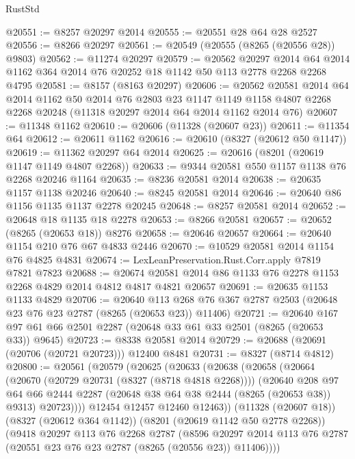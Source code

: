 \begin{lexlean}{RustStd}
\begin{coremodule}
{\begin{coremodule}
{{{{{{{{{{{{{{{{{{{{{{{{{{{{{{{{{{{{{{{{{{{{{{{{{{{{{{@20551 := @8257 @20297 @2014
@20555 := @20551 @28 @64 @28 @2527
@20556 := @8266 @20297
@20561 := @20549 (@20555 (@8265 (@20556 @28)) @9803)
@20562 := @11274 @20297
@20579 := @20562
    @20297
    @2014
    @64
    @2014
    @1162
    @364
    @2014
    @76
    @20252
    @18
    @1142
    @50
    @113
    @2778
    @2268
    @2268
    @4795
@20581 := @8157 (@8163 @20297)
@20606 := @20562
    @20581
    @2014
    @64
    @2014
    @1162
    @50
    @2014
    @76
    @2803
    @23
    @1147
    @1149
    @1158
    @4807
    @2268
    @2268
    @20248
    (@11318 @20297 @2014 @64 @2014 @1162 @2014 @76)
@20607 := @11348 @1162
@20610 := @20606 (@11328 (@20607 @23))
@20611 := @11354 @64
@20612 := @20611 @1162
@20616 := @20610 (@8327 (@20612 @50 @1147))
@20619 := @11362 @20297 @64 @2014
@20625 := @20616 (@8201 (@20619 @1147 @1149 @4807 @2268))
@20633 := @9344 @20581 @550 @1157 @1138 @76 @2268 @20246 @1164
@20635 := @8236 @20581 @2014
@20638 := @20635 @1157 @1138 @20246
@20640 := @8245 @20581 @2014
@20646 := @20640 @86 @1156 @1135 @1137 @2278 @20245
@20648 := @8257 @20581 @2014
@20652 := @20648 @18 @1135 @18 @2278
@20653 := @8266 @20581
@20657 := @20652 (@8265 (@20653 @18)) @8276
@20658 := @20646 @20657
@20664 := @20640 @1154 @210 @76 @67 @4833 @2446
@20670 := @10529 @20581 @2014 @1154 @76 @4825 @4831
@20674 := LexLeanPreservation.Rust.Corr.apply @7819 @7821 @7823
@20688 := @20674 @20581 @2014 @86 @1133 @76 @2278 @1153 @2268 @4829 @2014 @4812 @4817 @4821 @20657
@20691 := @20635 @1153 @1133 @4829
@20706 := @20640
    @113
    @268
    @76
    @367
    @2787
    @2503
    (@20648 @23 @76 @23 @2787 (@8265 (@20653 @23)) @11406)
@20721 := @20640 @167 @97 @61 @66 @2501 @2287 (@20648 @33 @61 @33 @2501 (@8265 (@20653 @33)) @9645)
@20723 := @8338 @20581 @2014
@20729 := @20688 (@20691 (@20706 (@20721 @20723))) @12400 @8481
@20731 := @8327 (@8714 @4812)
@20800 := @20561
    (@20579
      (@20625
        (@20633
          (@20638
            (@20658
              (@20664
                (@20670 (@20729 @20731 (@8327 (@8718 @4818 @2268))))
                (@20640
                  @208
                  @97
                  @64
                  @66
                  @2444
                  @2287
                  (@20648 @38 @64 @38 @2444 (@8265 (@20653 @38)) @9313)
                  @20723))))
          @12454
          @12457
          @12460
          @12463))
      (@11328 (@20607 @18))
      (@8327 (@20612 @364 @1142))
      (@8201 (@20619 @1142 @50 @2778 @2268))
      (@9418
        @20297
        @113
        @76
        @2268
        @2787
        (@8596 @20297 @2014 @113 @76 @2787 (@20551 @23 @76 @23 @2787 (@8265 (@20556 @23)) @11406))))
}}}}}}}}}}}}}}}}}}}}}}}}}}}}}}}}}}}}}}}}}}}}}}}}}}}}}}
\end{coremodule}}
\end{coremodule}
\end{lexlean}
